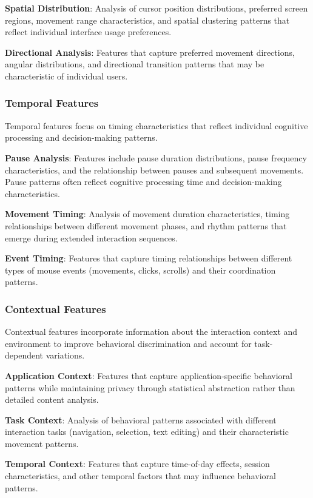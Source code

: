 \documentclass[
  12pt,
  a4paper,
]{report}
\begin{document}
\textbf{Spatial Distribution}: Analysis of cursor position
distributions, preferred screen regions, movement range characteristics,
and spatial clustering patterns that reflect individual interface usage
preferences.

\textbf{Directional Analysis}: Features that capture preferred movement
directions, angular distributions, and directional transition patterns
that may be characteristic of individual users.

\subsubsection{Temporal Features}\label{temporal-features}

Temporal features focus on timing characteristics that reflect
individual cognitive processing and decision-making patterns.

\textbf{Pause Analysis}: Features include pause duration distributions,
pause frequency characteristics, and the relationship between pauses and
subsequent movements. Pause patterns often reflect cognitive processing
time and decision-making characteristics.

\textbf{Movement Timing}: Analysis of movement duration characteristics,
timing relationships between different movement phases, and rhythm
patterns that emerge during extended interaction sequences.

\textbf{Event Timing}: Features that capture timing relationships
between different types of mouse events (movements, clicks, scrolls) and
their coordination patterns.

\subsubsection{Contextual Features}\label{contextual-features}

Contextual features incorporate information about the interaction
context and environment to improve behavioral discrimination and account
for task-dependent variations.

\textbf{Application Context}: Features that capture application-specific
behavioral patterns while maintaining privacy through statistical
abstraction rather than detailed content analysis.

\textbf{Task Context}: Analysis of behavioral patterns associated with
different interaction tasks (navigation, selection, text editing) and
their characteristic movement patterns.

\textbf{Temporal Context}: Features that capture time-of-day effects,
session characteristics, and other temporal factors that may influence
behavioral patterns.
\end{document}
